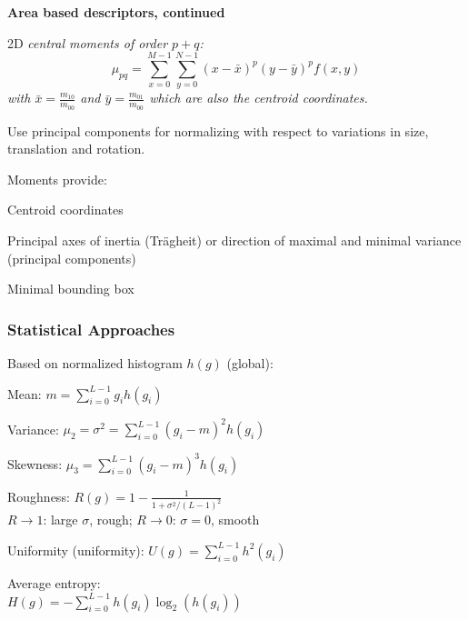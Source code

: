  \begin{minipage}{9cm}
    \textbf{Area based descriptors, continued}
    
      2D \em central \em moments of order $p+q$: $$\mu_{pq} = \sum_{x=0}^{M-1} \sum_{y=0}^{N-1} (x-\bar{x})^p (y-\bar{y})^p f(x,y)$$
      with $\bar{x}=\frac{m_{10}}{m_{00}}$ and $\bar{y}=\frac{m_{01}}{m_{00}}$ which are also the
      centroid coordinates.
      
      Use principal components for normalizing with respect to variations in size, translation and 
      rotation.
      
      Moments provide:
      \begin{compactList}
        \item Centroid coordinates
        \item Principal axes of inertia (Trägheit) or direction of maximal and minimal 
          variance (principal components)
        \item Minimal bounding box
      \end{compactList}
    
      \subsubsection{Statistical Approaches}
        Based on normalized histogram $h(g)$ (global):\\ 
        \begin{compactList}
          \item Mean: $m=\sum_{i=0}^{L-1} g_i h(g_i)$
          \item Variance: $\mu_2 = \sigma^2 = \sum_{i=0}^{L-1} (g_i-m)^2 h(g_i)$
          \item Skewness: $\mu_3 = \sum_{i=0}^{L-1} (g_i-m)^3 h(g_i)$
          \item Roughness: $R(g) = 1 - \frac{1}{1 + \sigma^2/(L-1)^2}$\\
            $R \rightarrow 1$: large $\sigma$, rough; $R \rightarrow 0$: $\sigma = 0$, smooth
          \item Uniformity (uniformity): $U(g) = \sum_{i=0}^{L-1} h^2(g_i)$
          \item Average entropy: \\$H(g) = -\sum_{i=0}^{L-1} h(g_i) \log_2(h(g_i))$
        \end{compactList}
      

\end{minipage}
